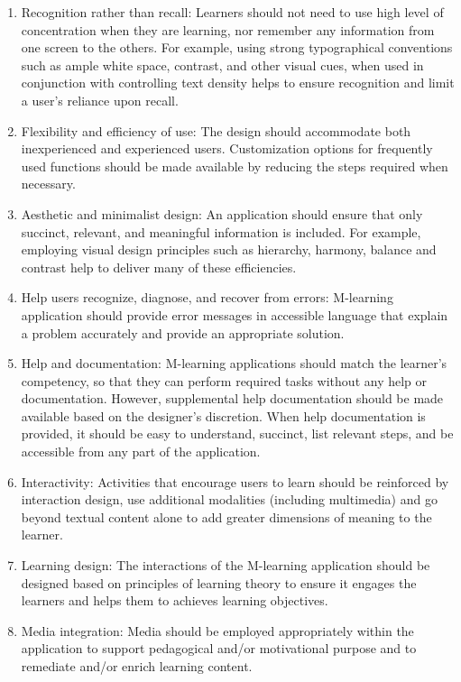 \begin{enumerate}
\item Recognition rather than recall: Learners should not need to use high level of concentration when they are learning, nor remember any information from one screen to the others. For example, using strong typographical conventions such as ample white space, contrast, and other visual cues, when used in conjunction with controlling text density helps to ensure recognition and limit a user's reliance upon recall. 

\item Flexibility and efficiency of use: The design should accommodate both inexperienced and experienced users. Customization options for frequently used functions should be made available by reducing the steps required when necessary.

\item  Aesthetic and minimalist design: An application should ensure that only succinct, relevant, and meaningful information is included. For example, employing visual design principles such as hierarchy, harmony, balance and contrast help to deliver many of these efficiencies. 

\item Help users recognize, diagnose, and recover from errors: M-learning application should provide error messages in accessible language that explain a problem accurately and provide an appropriate solution. 

\item Help and documentation: M-learning applications should match the learner's competency, so that they can perform required tasks without any help or documentation. However, supplemental help documentation should be made available based on the designer's discretion. When help documentation is provided, it should be easy to understand, succinct, list relevant steps, and be accessible from any part of the application. 

\item Interactivity: Activities that encourage users to learn should be reinforced by interaction design, use additional modalities (including multimedia) and go beyond textual content alone to add greater dimensions of meaning to the learner.

\item Learning design: The interactions of the M-learning application should be designed based on principles of learning theory to ensure it engages the learners and helps them to achieves learning objectives. 

\item Media integration: Media should be employed appropriately within the application to support pedagogical and/or motivational purpose and to remediate and/or enrich learning content.


\end{enumerate}
